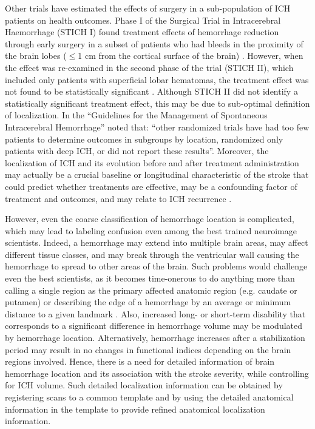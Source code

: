 \documentclass[10pt]{article}\usepackage[]{graphicx}\usepackage[]{color}
\begin{document}
Other trials have estimated the effects of surgery in a sub-population of ICH patients on health outcomes. %
Phase I of the Surgical Trial in Intracerebral Haemorrhage (STICH I) found treatment effects of hemorrhage reduction through early surgery in a subset of patients who had bleeds in the proximity of the brain lobes ($≤$1 cm from the cortical surface of the brain) \citep{mendelow_early_2005}. However, when the effect was re-examined in the second phase of the trial (STICH II), which included only patients with superficial lobar hematomas, the treatment effect was not found to be statistically significant \citep{mendelow_early_2013}.  Although STICH II did not identify a statistically significant treatment effect, this may be due to sub-optimal definition of localization.  In the ``Guidelines for the Management of Spontaneous Intracerebral Hemorrhage'' \citet{morgenstern_guidelines_2010} noted that: ``other randomized trials have had too few patients to determine outcomes in subgroups by location, randomized only patients with deep ICH, or did not report these results''.  Moreover, the localization of ICH and its evolution before and after treatment administration may actually be a crucial baseline or longitudinal characteristic of the stroke that could predict whether treatments are effective, may be a confounding factor of treatment and outcomes, and may relate to ICH recurrence \citep{fitzmaurice_effect_2008}.  

However, even the coarse classification of hemorrhage location is complicated,  which may lead to labeling confusion even among the best trained neuroimage scientists. Indeed, a hemorrhage may extend into multiple brain areas, may affect different tissue classes, and may break through the ventricular wall causing the hemorrhage to spread to other areas of the brain.  Such problems would challenge even the best scientists, as it becomes time-onerous to do anything more than calling a single region as the primary affected anatomic region (e.g. caudate or putamen) or describing the edge of a hemorrhage by an average or minimum distance to a given landmark \citep{ziai_multicenter_2013}.  Also, increased long- or short-term disability that corresponds to a significant difference in hemorrhage volume may be modulated by hemorrhage location.  Alternatively, hemorrhage increases after a stabilization period may result in no changes in functional indices depending on the brain regions involved. Hence, there is a need for detailed information of brain hemorrhage location and its association with the stroke severity, while controlling for ICH volume.  Such detailed localization information can be obtained by registering scans to a common template and by using the detailed anatomical information in the template to provide refined anatomical localization information.  
\end{document}
